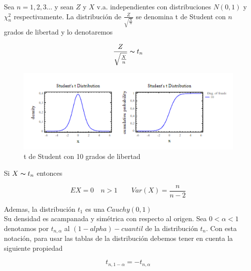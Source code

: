 Sea $n = 1,2,3\dots$ y sean $Z$ y $X$ v.a. independientes con distribuciones $N(0,1)$ y $\chi^2_n$ respectivamente.
La distribución de $\frac{Z}{\sqrt{\frac{X}{n}}}$ se denomina t de Student con $n$ grados de libertad y lo denotaremos

\[
    \frac{Z}{\sqrt{\frac{X}{n}}} \thicksim t_n
\]

\begin{figure}[h!]
    \begin{center}
        \includegraphics{img/t10.png}
    \end{center}
    \caption{t de Student con 10 grados de libertad}
\end{figure}

Si $X \thicksim t_n$ entonces

\[
    EX = 0 \quad n > 1 \qquad Var(X) = \frac{n}{n-2}
\]

Ademas, la distribución $t_1$ es una $Cauchy(0,1)$ \\

Su densidad es acampanada y simétrica con respecto al origen. Sea $0 < \alpha < 1$ denotamos por $t_{n,\alpha}$ al $(1-alpha)-cuantil$ de la distribución $t_n$. Con esta notación, para usar las tablas de la distribución
debemos tener en cuenta la siguiente propiedad

\[
    t_{n, 1-\alpha} = -t_{n,\alpha}
\]
